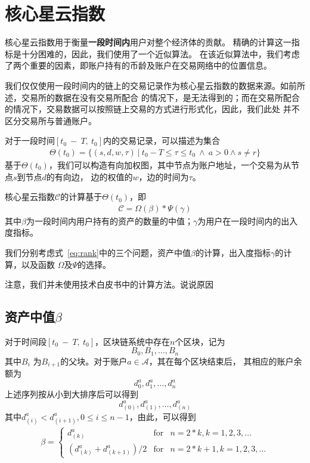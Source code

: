 \section{核心星云指数}

核心星云指数用于衡量{\textbf{一段时间内}}用户对整个经济体的贡献。
精确的计算这一指标是十分困难的，因此，我们使用了一个近似算法。
在该近似算法中，我们考虑了两个重要的因素，即账户持有的币龄及账户在交易网络中的位置信息。


我们仅仅使用一段时间内的链上的交易记录作为核心星云指数的数据来源。如前所述，交易所的数据在没有交易所配合
的情况下，是无法得到的；而在交易所配合的情况下，交易数据可以按照链上交易的方式进行形式化，因此，我们此处
并不区分交易所与普通账户。

对于一段时间$[t_0\ −\ T,\ t_0]$内的交易记录，可以描述为集合
\begin{align}
\Theta(t_0) = \{(s, d, w, \tau)\ |\ t_0 - T \le \tau \le t_0\ \land \ a > 0 \land s \neq r \}
\end{align}
\noindent 基于$\Theta(t_0)$，我们可以构造有向加权图，其中节点为账户地址，一个交易为从节点$s$到节点$d$的有向边，
边的权值的$w$，边的时间为$\tau$。



核心星云指数$\mathcal{C}$的计算基于$\Theta(t_0)$，即
\begin{align}
\mathcal{C} = \Omega(\beta) * \Psi(\gamma)
\label{eq:rank}
\end{align}
\noindent 其中$\beta$为一段时间内用户持有的资产的数量的中值；$\gamma$为用户在一段时间内的出入度指标。

我们分别考虑式~\ref{eq:rank}中的三个问题，资产中值$\beta$的计算，出入度指标$\gamma$的计算，以及函数
$\Omega$及$\Psi$的选择。

{\color{gray}注意，我们并未使用技术白皮书中的计算方法。说说原因}
\subsection*{资产中值$\beta$}
对于时间段$[t_0\ −\ T,\ t_0]$，区块链系统中存在$n$个区块，记为
\[
B_0, B_1, \dots, B_n
\]
\noindent 其中$B_{i}$ 为$B_{i+1}$的父块。对于账户$a \in \mathcal{A}$，其在每个区块结束后，
其相应的账户余额为
\[
d^a_0, d^a_1, \dots, d^a_n
\]
上述序列按从小到大排序后可以得到
\[
d^a_{(0)}, d^a_{(1)}, \dots, d^a_{(n)}
\]
其中$d^a_{(i)} < d^a_{(i+1)}, 0\le i \le {n-1}$，由此，可以得到
\begin{align}
\beta = \left\{ \begin{array}{rcl}
{d^a_{(k)}} & \mbox{for} & n=2*k, k=1, 2, 3, \ldots \\
{(d^a_{(k)} + d^a_{(k+1)})/2} & \mbox{for} & n=2*k + 1, k=1, 2, 3, \ldots
\end{array}\right.
\end{align}

